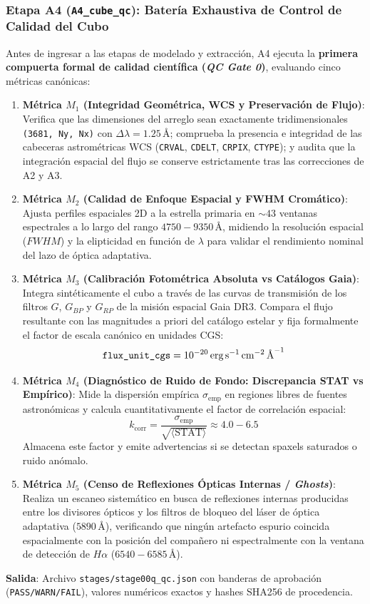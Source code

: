 \documentclass[11pt,a4paper]{article}
\begin{document}
\subsubsection{Etapa A4 (\texttt{A4\_cube\_qc}): Batería Exhaustiva de Control de Calidad del Cubo}
Antes de ingresar a las etapas de modelado y extracción, A4 ejecuta la \textbf{primera compuerta formal de calidad científica (\textit{QC Gate 0})}, evaluando cinco métricas canónicas:
\begin{enumerate}[leftmargin=1.0cm]
    \item \textbf{Métrica $M_1$ (Integridad Geométrica, WCS y Preservación de Flujo)}: Verifica que las dimensiones del arreglo sean exactamente tridimensionales \texttt{(3681, Ny, Nx)} con $\Delta\lambda = 1.25\,\text{\AA}$; comprueba la presencia e integridad de las cabeceras astrométricas WCS (\texttt{CRVAL}, \texttt{CDELT}, \texttt{CRPIX}, \texttt{CTYPE}); y audita que la integración espacial del flujo se conserve estrictamente tras las correcciones de A2 y A3.
    \item \textbf{Métrica $M_2$ (Calidad de Enfoque Espacial y FWHM Cromático)}: Ajusta perfiles espaciales 2D a la estrella primaria en $\sim 43$ ventanas espectrales a lo largo del rango $4750 - 9350\,\text{\AA}$, midiendo la resolución espacial ($FWHM$) y la elipticidad en función de $\lambda$ para validar el rendimiento nominal del lazo de óptica adaptativa.
    \item \textbf{Métrica $M_3$ (Calibración Fotométrica Absoluta vs Catálogos Gaia)}: Integra sintéticamente el cubo a través de las curvas de transmisión de los filtros $G$, $G_{BP}$ y $G_{RP}$ de la misión espacial Gaia DR3. Compara el flujo resultante con las magnitudes a priori del catálogo estelar y fija formalmente el factor de escala canónico en unidades CGS:
    $$\text{\texttt{flux\_unit\_cgs}} = 10^{-20}\,\text{erg}\,\text{s}^{-1}\,\text{cm}^{-2}\,\text{\AA}^{-1}$$
    \item \textbf{Métrica $M_4$ (Diagnóstico de Ruido de Fondo: Discrepancia STAT vs Empírico)}: Mide la dispersión empírica $\sigma_\text{emp}$ en regiones libres de fuentes astronómicas y calcula cuantitativamente el factor de correlación espacial:
    $$k_\text{corr} = \frac{\sigma_\text{emp}}{\sqrt{\langle \text{STAT} \rangle}} \approx 4.0 - 6.5$$
    Almacena este factor y emite advertencias si se detectan spaxels saturados o ruido anómalo.
    \item \textbf{Métrica $M_5$ (Censo de Reflexiones Ópticas Internas / \textit{Ghosts})}: Realiza un escaneo sistemático en busca de reflexiones internas producidas entre los divisores ópticos y los filtros de bloqueo del láser de óptica adaptativa ($5890\,\text{\AA}$), verificando que ningún artefacto espurio coincida espacialmente con la posición del compañero ni espectralmente con la ventana de detección de $H\alpha$ ($6540 - 6585\,\text{\AA}$).
\end{enumerate}
\noindent\textbf{Salida}: Archivo \texttt{stages/stage00q\_qc.json} con banderas de aprobación (\texttt{PASS/WARN/FAIL}), valores numéricos exactos y hashes SHA256 de procedencia.
\end{document}
